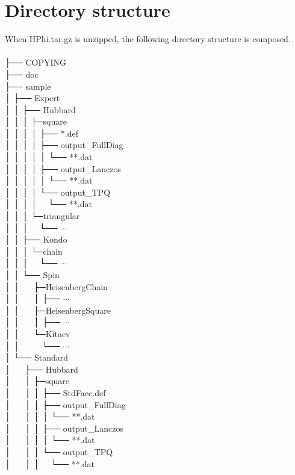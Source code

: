 \section{Directory structure}
When HPhi.tar.gz is unzipped, the following directory structure is composed.\\
\\
├── COPYING\\
├── doc\\
├── sample\\
│  ├── Expert\\
│  │  ├── Hubbard\\
│  │  │  ├─square\\
│  │  │  │  ├── *.def\\
│  │  │  │  ├── output\_FullDiag\\
│  │  │  │  │ └── **.dat\\
│  │  │  │  ├── output\_Lanczos\\
│  │  │  │  │ └── **.dat\\
│  │  │  │  └── output\_TPQ\\
│  │  │  │    ~~└── **.dat\\
│  │  │  └─triangular\\
│  │  │  ~~└── $\cdots$\\
│  │  ├── Kondo\\
│  │  │  └─chain\\
│  │  │  ~~└── $\cdots$\\
│  │  └── Spin\\
│  │    ~~  ├─HeisenbergChain\\
│  │    ~~  │  ├── $\cdots$\\
│  │    ~~  ├─HeisenbergSquare\\
│  │    ~~  │  ├── $\cdots$\\
│  │    ~~  └─Kitaev\\
│  │    ~~  ~~└── $\cdots$\\
│  └── Standard\\
│  ~~  ├── Hubbard\\
│  ~~  │  ├─square\\
│  ~~  │  │  ├── StdFace.def\\
│  ~~  │  │  ├── output\_FullDiag\\
│  ~~  │  │  │ └── **.dat\\
│  ~~  │  │  ├── output\_Lanczos\\
│  ~~  │  │  │ └── **.dat\\
│  ~~  │  │  └── output\_TPQ\\
│  ~~  │  │    ~~└── **.dat\\
